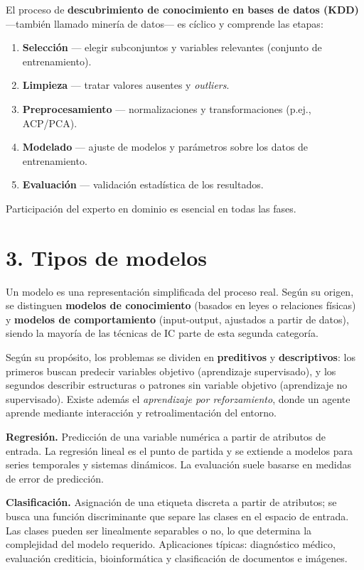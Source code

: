 \documentclass[11pt,a4paper]{article}
\begin{document}
El proceso de \textbf{descubrimiento de conocimiento en bases de datos (KDD)} —también
llamado minería de datos— es cíclico y comprende las etapas:
\begin{enumerate}[leftmargin=1.4em, itemsep=1pt, topsep=2pt]
  \item \textbf{Selección} --- elegir subconjuntos y variables relevantes (conjunto de entrenamiento).
  \item \textbf{Limpieza} --- tratar valores ausentes y \emph{outliers}.
  \item \textbf{Preprocesamiento} --- normalizaciones y transformaciones (p.ej., ACP/PCA).
  \item \textbf{Modelado} --- ajuste de modelos y parámetros sobre los datos de entrenamiento.
  \item \textbf{Evaluación} --- validación estadística de los resultados.
\end{enumerate}
Participación del experto en dominio es esencial en todas las fases.

\section*{3. Tipos de modelos}

Un modelo es una representación simplificada del proceso real. Según su origen,
se distinguen \textbf{modelos de conocimiento} (basados en leyes o relaciones físicas)
y \textbf{modelos de comportamiento} (input-output, ajustados a partir de datos),
siendo la mayoría de las técnicas de IC parte de esta segunda categoría.

Según su propósito, los problemas se dividen en \textbf{preditivos} y
\textbf{descriptivos}: los primeros buscan predecir variables objetivo (aprendizaje
supervisado), y los segundos describir estructuras o patrones sin variable objetivo
(aprendizaje no supervisado). Existe además el \emph{aprendizaje por reforzamiento},
donde un agente aprende mediante interacción y retroalimentación del entorno.

\textbf{Regresión.} Predicción de una variable numérica a partir de atributos de
entrada. La regresión lineal es el punto de partida y se extiende a modelos para
series temporales y sistemas dinámicos. La evaluación suele basarse en medidas de
error de predicción.

\textbf{Clasificación.} Asignación de una etiqueta discreta a partir de atributos;
se busca una función discriminante que separe las clases en el espacio de entrada.
Las clases pueden ser linealmente separables o no, lo que determina la complejidad
del modelo requerido. Aplicaciones típicas: diagnóstico médico, evaluación crediticia,
bioinformática y clasificación de documentos e imágenes.
\end{document}
